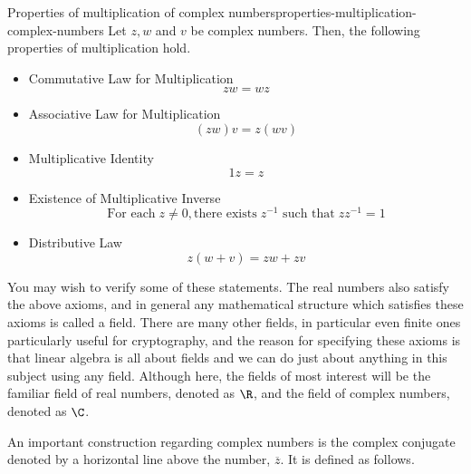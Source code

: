 \begin{theorem}{Properties of multiplication of complex numbers}{properties-multiplication-complex-numbers}
  Let $z,w$ and $v$ be complex numbers. Then, the following properties of multiplication hold.

  \begin{itemize}

  \item Commutative Law for Multiplication
    \begin{equation*}
      zw=wz
    \end{equation*}

  \item Associative Law for Multiplication
    \begin{equation*}
      (zw) v=z(wv) 
    \end{equation*}

  \item Multiplicative Identity
    \begin{equation*}
      1z=z
    \end{equation*}

  \item Existence of Multiplicative Inverse
    \begin{equation*}
      \mbox{For each}\; z\neq 0, \mbox{there exists}\; z^{-1} \mbox{ such that}\; zz^{-1}=1
    \end{equation*}

  \item Distributive Law
    \begin{equation*}
      z(w+v) =zw+zv
    \end{equation*}
  \end{itemize}
\end{theorem}

You may wish to verify some of these statements.  The real numbers
also satisfy the above axioms, and in general any mathematical
structure which satisfies these axioms is called a field. There are
many other fields, in particular even finite ones particularly useful
for cryptography, and the reason for specifying these axioms is that
linear algebra is all about fields and we can do just about anything
in this subject using any field. Although here, the fields of most
interest will be the familiar field of real numbers, denoted as
$\R$, and the field of complex numbers, denoted as
$\C$.

An important construction regarding complex numbers is the complex
conjugate denoted by a horizontal line above the number, $\overline{z}$. It
is defined as follows.

